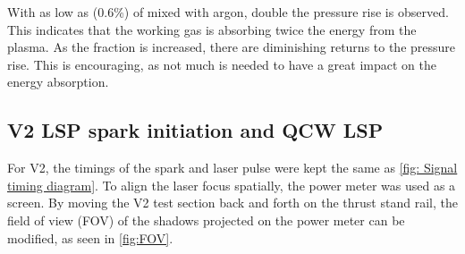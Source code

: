             With as low as (0.6\%) of  mixed with argon, double the pressure rise is observed. This indicates that the working gas is absorbing twice the energy from the plasma. As the  fraction is increased, there are diminishing returns to the pressure rise. This is encouraging, as not much  is needed to have a great impact on the energy absorption.

        \subsection{V2 LSP spark initiation and QCW LSP}

            For V2, the timings of the spark and laser pulse were kept the same as \autoref{fig: Signal timing diagram}. To align the laser focus spatially, the power meter was used as a screen. By moving the V2 test section back and forth on the thrust stand rail, the field of view (FOV) of the shadows projected on the power meter can be modified, as seen in \autoref{fig:FOV}. 
            
